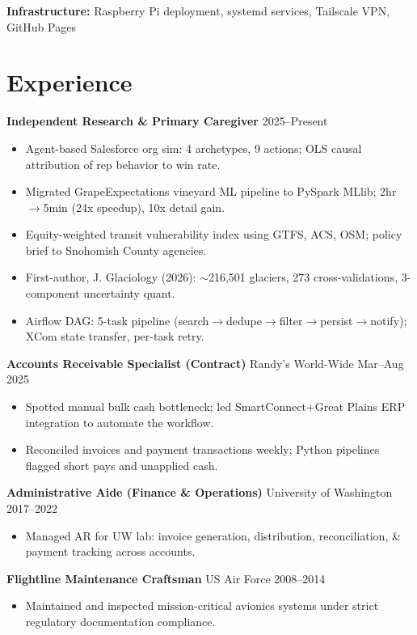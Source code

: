 \documentclass[11pt,a4paper]{article}
\begin{document}
\noindent
\textbf{Infrastructure:} Raspberry Pi deployment, systemd services, Tailscale VPN, GitHub Pages

\section*{Experience}

\noindent
\textbf{Independent Research \& Primary Caregiver} \hfill 2025--Present
\begin{itemize}
    \item Agent-based Salesforce org sim: 4 archetypes, 9 actions; OLS causal attribution of rep behavior to win rate.
    \item Migrated GrapeExpectations vineyard ML pipeline to PySpark MLlib; 2hr$\rightarrow$5min (24x speedup), 10x detail gain.
    \item Equity-weighted transit vulnerability index using GTFS, ACS, OSM; policy brief to Snohomish County agencies.
    \item First-author, J. Glaciology (2026): $\sim$216,501 glaciers, 273 cross-validations, 3-component uncertainty quant.
    \item Airflow DAG: 5-task pipeline (search$\rightarrow$dedupe$\rightarrow$filter$\rightarrow$persist$\rightarrow$notify); XCom state transfer, per-task retry.
\end{itemize}

\vspace{0.2cm}
\noindent
\textbf{Accounts Receivable Specialist (Contract)} \hfill Randy's World-Wide \hfill Mar--Aug 2025
\begin{itemize}
    \item Spotted manual bulk cash bottleneck; led SmartConnect+Great Plains ERP integration to automate the workflow.
    \item Reconciled invoices and payment transactions weekly; Python pipelines flagged short pays and unapplied cash.
\end{itemize}

\vspace{0.2cm}
\noindent
\textbf{Administrative Aide (Finance \& Operations)} \hfill University of Washington \hfill 2017--2022
\begin{itemize}
    \item Managed AR for UW lab: invoice generation, distribution, reconciliation, \& payment tracking across accounts.
\end{itemize}

\vspace{0.2cm}
\noindent
\textbf{Flightline Maintenance Craftsman} \hfill US Air Force \hfill 2008--2014
\begin{itemize}
    \item Maintained and inspected mission-critical avionics systems under strict regulatory documentation compliance.
\end{itemize}
\end{document}
